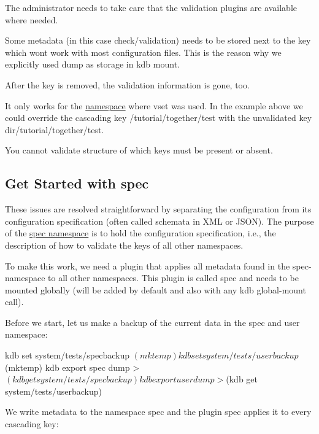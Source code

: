 \begin{DoxyItemize}
\item The administrator needs to take care that the validation plugins are available where needed.
\item Some metadata (in this case {\ttfamily check/validation}) needs to be stored next to the key which won\textquotesingle{}t work with most configuration files. This is the reason why we explicitly used {\ttfamily dump} as storage in {\ttfamily kdb mount}.
\item After the key is removed, the validation information is gone, too.
\item It only works for the \hyperlink{doc_tutorials_namespaces_md}{namespace} where {\ttfamily vset} was used. In the example above we could override the cascading key {\ttfamily /tutorial/together/test} with the unvalidated key {\ttfamily dir/tutorial/together/test}.
\item You cannot validate structure of which keys must be present or absent.
\end{DoxyItemize}

\subsection*{Get Started with {\ttfamily spec}}

These issues are resolved straightforward by separating the configuration from its configuration specification (often called schemata in X\+ML or J\+S\+ON). The purpose of the \hyperlink{doc_tutorials_namespaces_md}{spec namespace} is to hold the configuration specification, i.\+e., the description of how to validate the keys of all other namespaces.

To make this work, we need a plugin that applies all metadata found in the {\ttfamily spec}-\/namespace to all other namespaces. This plugin is called {\ttfamily spec} and needs to be mounted globally (will be added by default and also with any {\ttfamily kdb global-\/mount} call).

Before we start, let us make a backup of the current data in the spec and user namespace\+:


\begin{DoxyCode}
kdb set system/tests/specbackup $(mktemp)
kdb set system/tests/userbackup $(mktemp)
kdb export spec dump > $(kdb get system/tests/specbackup)
kdb export user dump > $(kdb get system/tests/userbackup)
\end{DoxyCode}


We write metadata to the namespace {\ttfamily spec} and the plugin {\ttfamily spec} applies it to every cascading key\+:


